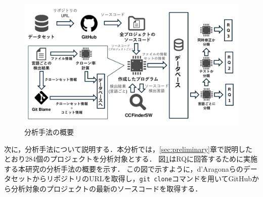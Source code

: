 \documentclass[T,J]{fose}
\begin{document}

\begin{figure}
    \centering
    \includegraphics[width=0.8\linewidth]{images/overviewOfMethod.pdf}
    \caption{分析手法の概要}
    \label{fig:overviewOfMethod}
\end{figure}


次に，分析手法について説明する．本分析では，\ref{sec:preliminary}章で説明したとおり284個のプロジェクトを分析対象とする．
図\ref{fig:overviewOfMethod}はRQに回答するために実施する本研究の分析手法の概要を示す．
この図で示すように，d'AragonaらのデータセットからリポジトリのURLを取得し，\verb|git clone|コマンドを用いてGitHubから分析対象のプロジェクトの最新のソースコードを取得する．
\end{document}
